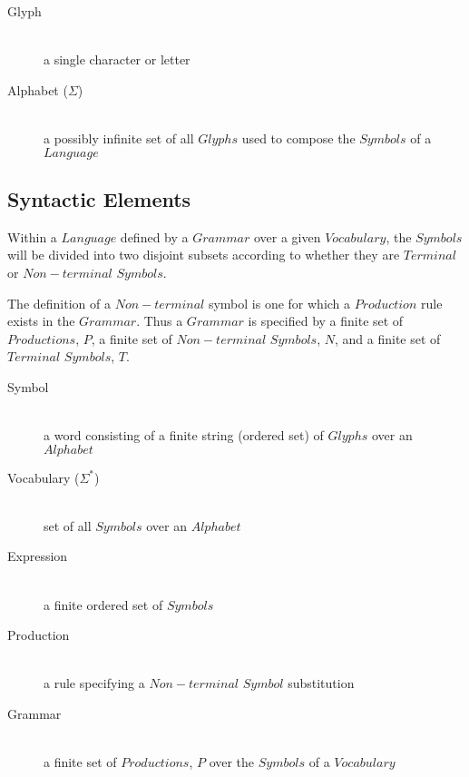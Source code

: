 \documentclass{article}
\begin{document}
    \begin{description}

    \item[Glyph] \hfill \\
    a single character or letter

    \item[Alphabet ($\Sigma$)] \hfill \\
    a possibly infinite set of all $Glyphs$ used to compose the
    $Symbols$ of a $Language$

    \end{description}

\subsection{Syntactic Elements}

Within a $Language$ defined by a $Grammar$ over a given $Vocabulary$,
the $Symbols$ will be divided into two disjoint subsets according to
whether they are $Terminal$ or $Non-terminal$ $Symbols$.

The definition of a $Non-terminal$ symbol is one for which a
$Production$ rule exists in the $Grammar$. Thus a $Grammar$ is
specified by a finite set of $Productions$, $P$, a finite set of
$Non-terminal$ $Symbols$, $N$, and a finite set of $Terminal$
$Symbols$, $T$.

    \begin{description}

    \item[Symbol] \hfill \\
    a word consisting of a finite string (ordered set) of $Glyphs$
    over an $Alphabet$

    \item[Vocabulary ($\Sigma^{*}$)] \hfill \\
    set of all $Symbols$ over an $Alphabet$

    \item[Expression] \hfill \\
    a finite ordered set of $Symbols$

    \item[Production] \hfill \\
    a rule specifying a $Non-terminal$ $Symbol$ substitution

    \item[Grammar] \hfill \\
    a finite set of $Productions$, $P$ over the $Symbols$ of a $Vocabulary$

    \end{description}
\end{document}
